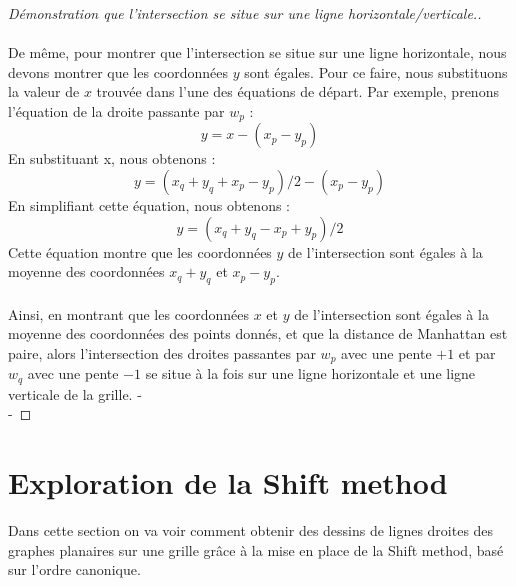\documentclass[hidelinks,letterpaper,12pt]{article}
\begin{document}
\begin{proof}[Démonstration que l'intersection se situe sur une ligne horizontale/verticale.]
\\ \\
De même, pour montrer que l'intersection se situe sur une ligne horizontale, nous devons montrer que les coordonnées $y$ sont égales. Pour ce faire, nous substituons la valeur de $x$ trouvée dans l'une des équations de départ. Par exemple, prenons l'équation de la droite passante par $w_p$ :
\[y = x - (x_p - y_p) \]
En substituant x, nous obtenons :
\[y = (x_q + y_q + x_p - y_p) / 2 - (x_p - y_p) \]
En simplifiant cette équation, nous obtenons :
\[y = (x_q + y_q - x_p + y_p) / 2\]
Cette équation montre que les coordonnées $y$ de l'intersection sont égales à la moyenne des coordonnées \(x_q + y_q \) et \( x_p - y_p\).
\\ \\
Ainsi, en montrant que les coordonnées $x$ et $y$ de l'intersection sont égales à la moyenne des coordonnées des points donnés, et que la distance de Manhattan est paire, alors l'intersection des droites passantes par $w_p$ avec une pente $+1$ et par $w_q$ avec une pente $-1$ se situe à la fois sur une ligne horizontale et une ligne verticale de la grille.
{\color{white}-}
\\
{\color{white}-}
\end{proof}



\newpage
\section{Exploration de la Shift method }
\label{Appliquer Shift méthode}
Dans cette section on va voir comment obtenir des dessins de lignes droites des graphes planaires sur une grille grâce à la mise en place de la Shift method, basé sur l'ordre canonique.
\end{document}
